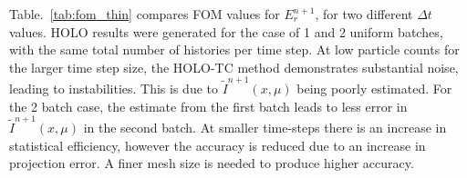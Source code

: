 \documentclass{anstrans}
\renewcommand{\ss}{\ensuremath{\|s\|}}
\begin{document}
Table.~\ref{tab:fom_thin} compares FOM values for $E_r^{n+1}$, for two different $\Delta t$ values.  HOLO results were
generated for the case of 1 and 2 uniform batches, with the same
total number of histories per time step.  At low particle counts for the larger time step
size, the HOLO-TC method
demonstrates substantial noise, leading to instabilities.  This is due to $\tilde
I^{n+1}(x,\mu)$ being poorly estimated.  For the 2 batch
case, the estimate from the first batch leads to less error in $\tilde I^{n+1}(x,\mu)$ in
the second batch.    At smaller time-steps there
is an increase in statistical efficiency, however the accuracy is reduced due to an
increase in projection error. A finer mesh size is needed to produce higher accuracy.

\end{document}
